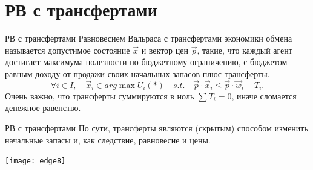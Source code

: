 \documentclass{beamer}
\begin{document}
\section{РВ с трансфертами}

\begin{frame}{РВ с трансфертами}
\alert{Равновесием Вальраса с трансфертами} экономики обмена называется допустимое состояние $\vec x$ и вектор цен $\vec p$, такие, что каждый агент достигает максимума полезности по бюджетному ограничению, с бюджетом равным доходу от продажи своих начальных запасов \alert{плюс трансферты}.
$$ \forall i \in I, \quad \vec x_i \in arg \max U_i(\ast) \quad s.t. \quad \vec p \cdot \vec x_i \leqslant \vec p \cdot \vec w_i + T_i.$$
Очень важно, что \alert{трансферты суммируются в ноль} $\sum T_i = 0$, иначе сломается денежное равенство.

\end{frame}

\begin{frame}{РВ с трансфертами}
По сути, трансферты являются (скрытым) способом изменить начальные запасы и, как следствие, равновесие и цены. 
\begin{center}
     \texttt{[image: edge8]}
     \end{center}
\end{frame}
\end{document}

